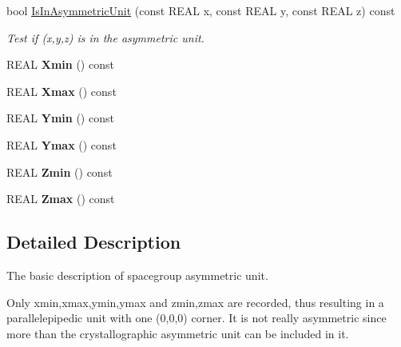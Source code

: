 \begin{DoxyCompactItemize}
\mbox{\label{class_obj_cryst_1_1_asymmetric_unit_a9381b72c139d8d0399b4c191bf108cf9}} 
bool \mbox{\hyperlink{class_obj_cryst_1_1_asymmetric_unit_a9381b72c139d8d0399b4c191bf108cf9}{Is\+In\+Asymmetric\+Unit}} (const R\+E\+AL x, const R\+E\+AL y, const R\+E\+AL z) const
\begin{DoxyCompactList}\small\item\em Test if (x,y,z) is in the asymmetric unit. \end{DoxyCompactList}\item 
\mbox{\label{class_obj_cryst_1_1_asymmetric_unit_a68cf506823f4ab583dde36733b26b730}} 
R\+E\+AL {\bfseries Xmin} () const
\item 
\mbox{\label{class_obj_cryst_1_1_asymmetric_unit_ad7c5c84ad1a1bd6da8fad62fea9ede20}} 
R\+E\+AL {\bfseries Xmax} () const
\item 
\mbox{\label{class_obj_cryst_1_1_asymmetric_unit_a63a6421bf5836994bcef5aa00e907157}} 
R\+E\+AL {\bfseries Ymin} () const
\item 
\mbox{\label{class_obj_cryst_1_1_asymmetric_unit_a283765baee75c7b0e7f88c9b14813f9e}} 
R\+E\+AL {\bfseries Ymax} () const
\item 
\mbox{\label{class_obj_cryst_1_1_asymmetric_unit_af56f28ae6036908de82772aa59e30998}} 
R\+E\+AL {\bfseries Zmin} () const
\item 
\mbox{\label{class_obj_cryst_1_1_asymmetric_unit_a9068f8ca8be1bdfac6211898dd0d29eb}} 
R\+E\+AL {\bfseries Zmax} () const
\end{DoxyCompactItemize}


\subsection{Detailed Description}
The basic description of spacegroup asymmetric unit. 

Only xmin,xmax,ymin,ymax and zmin,zmax are recorded, thus resulting in a parallelepipedic unit with one (0,0,0) corner. It is not really \textquotesingle{}asymmetric\textquotesingle{} since more than the crystallographic asymmetric unit can be included in it.

